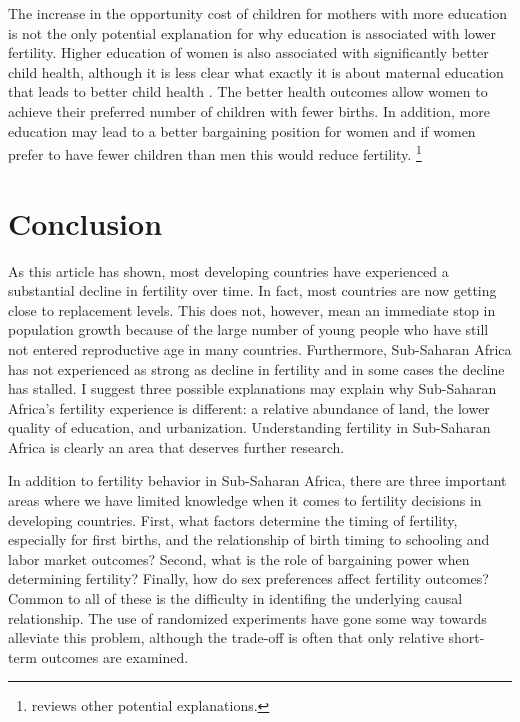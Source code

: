 \documentclass[letterpaper,12pt]{article}
\begin{document}
The increase in the opportunity cost of children for mothers with more
education is not the only potential explanation for why education is
associated with lower fertility. 
Higher education of women is also associated with significantly better
child health, although it is less clear what exactly it is about
maternal education that leads to better child health
\citep{Thomas1991,Glewwe1999,Kovsted2002}. 
The better health outcomes allow women to achieve their preferred number
of children with fewer births. 
In addition, more education may lead to a better bargaining position for
women and if women prefer to have fewer children than men this would
reduce fertility.%
\footnote{
\citet{Ainsworth1996} reviews other potential explanations.}

\section{Conclusion}\label{conclusion}

As this article has shown, most developing countries have experienced a
substantial decline in fertility over time. 
In fact, most countries are now getting close to replacement levels. 
This does not, however, mean an immediate stop in population growth
because of the large number of young people who have still not entered
reproductive age in many countries. 
Furthermore, Sub-Saharan Africa has not experienced as strong as decline
in fertility and in some cases the decline has stalled. 
I suggest three possible explanations may explain why Sub-Saharan
Africa's fertility experience is different: a relative abundance of
land, the lower quality of education, and urbanization. 
Understanding fertility in Sub-Saharan Africa is clearly an area that
deserves further research.

In addition to fertility behavior in Sub-Saharan Africa, there are three
important areas where we have limited knowledge when it comes to
fertility decisions in developing countries. 
First, what factors determine the timing of fertility, especially for
first births, and the relationship of birth timing to schooling and
labor market outcomes? Second, what is the role of bargaining power when
determining fertility? Finally, how do sex preferences affect fertility
outcomes? Common to all of these is the difficulty in identifing the
underlying causal relationship. 
The use of randomized experiments have gone some way towards alleviate
this problem, although the trade-off is often that only relative
short-term outcomes are examined.
\end{document}
